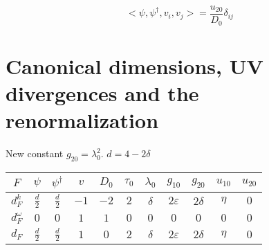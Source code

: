 \documentclass[12pt]{article}
\def\epsilon{\varepsilon}
\begin{document}
\begin{equation}
    <\psi, \psi^{\dagger}, v_{i}, v_{j}>= \frac{u_{20}}{D_{0}}\delta_{ij}
\end{equation}

\section{Canonical dimensions, UV divergences and the renormalization}
\label{sec:Reno}

New constant $g_{20}=\lambda^2_{0}$. 
$d=4-2\delta$


\begin{tabular}{|c|c|c|c|c|c|c|c|c|c|c|}
\hline
$F$ & $\psi$ & $\psi^\dagger$ & $v$ & $D_0$ & $\tau_0$ & $ \lambda_0$ & $g_{10}$ & $g_{20}$ & $u_{10}$ & $u_{20}$ \\
\hline
$d_F^k$      & $\frac{d}{2}$ & $\frac{d}{2}$ & $-1$ & $-2$ & $2$ & $\delta$ & $2\epsilon$ & $2\delta$ & $\eta$ & $0$ \\
\hline
$d_F^\omega$ & $0$ & $0$ & $1$ & $1$ & $0$ & $0$ & $0$ & $0$ & $0$ & $0$\\
\hline
$d_F$        & $\frac{d}{2}$ & $\frac{d}{2}$ & $1$ & $0$ & $2$ & $\delta$ & $2\epsilon$ & $2\delta$ & $\eta$ & $0$ \\
\hline
\end{tabular}
\end{document}
